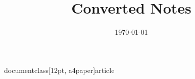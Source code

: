 documentclass[12pt, a4paper]{article}

\usepackage{amsmath}
\usepackage{amssymb}
\usepackage{amsthm}
\usepackage{graphicx}
\usepackage{geometry}
\usepackage{parskip}
\usepackage{microtype}

\geometry{margin=2.5cm}

\title{Converted Notes}
\author{}
\date{\today}

\maketitle










